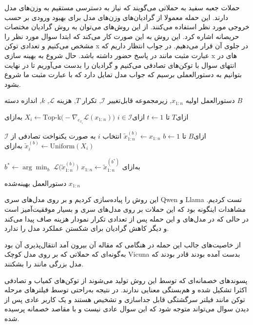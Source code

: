حملات جعبه سفید به حملاتی می‌گویند که نیاز به دسترسی مستقیم به وزن‌های مدل دارند. این حمله معمولا از گرادیان‌های وزن‌های مدل برای بهبود ورودی بر حسب خروجی مورد نظر استفاده می‌کنند. از این روش‌های می‌توان به روش گرادیان مختصات حریصانه اشاره کرد. این روش به این صورت کار می‌کند که ابتدا سوال مورد نظر را مشخص می‌کنیم و تعدادی توکن x در جلوی آن قرار می‌دهیم. در جواب انتظار داریم که عبارت مثبت مانند  در پاسخ حضور داشته باشد. حال شروع به بهینه سازی x های در انتهای سوال با توکن‌های تصادفی می‌کنیم و گرادیان را بدست می‌آوریم تا در نهایت بتوانیم به دستورالعملی برسیم که جواب مدل تمایل دارد که با عبارت مثبت ما شروع بشود.

 دستورالعمل اولیه $x_{1:n}$, زیرمجموعه قابل‌تغییر $\mathcal{I}$, 
  تکرار $T$, هزینه $\mathcal{L}$, $k$, اندازه دسته $B$

‌ازای{$t \gets 1 \text{ تا } T$}
  ‌ازای{$i \in \mathcal{I}$}
     $X_i \gets \mathrm{Top\text{-}k}\bigl(-\nabla_{e_{x_i}}\mathcal{L}(x_{1:n})\bigr)$ 
  ‌به‌ازای

  ‌ازای{$b \gets 1 \text{ تا } B$}
     $\tilde{x}^{(b)}_{1:n} \gets x_{1:n}$ 
     انتخاب $i$ به صورت یکنواخت تصادفی از $\mathcal{I}$
     $\tilde{x}^{(b)}_i \gets \mathrm{Uniform}(X_i)$ 
  ‌به‌ازای

   $b^* \gets \arg \min_{b}\; \mathcal{L}\bigl(\tilde{x}^{(b)}_{1:n}\bigr)$
   $x_{1:n} \gets \tilde{x}^{(b^*)}_{1:n}$ 
‌به‌ازای

  دستورالعمل بهینه‌شده $x_{1:n}$

این روش را پیاده‌سازی کردیم و بر روی مدل‌های سری Qwen و Llama تست کردیم. مشاهدات اینگونه بود که این حملات بر روی مدل‌های سری  و  بسیار موفقیت‌آمیز است در حالی که در مدل‌های  و  این حمله پس از تعدادی تکرار نمودار هزینه صاف پیدا می‌کند و دیگر کاهش گرادیان برای شکستن عملکرد مدل را ندارد.


از خاصیت‌های جالب این حمله در هنگامی که مقاله آن بیرون آمد انتقال‌پذیری آن بود به‌گونه‌ای که حملاتی که بر روی مدل کوچک Vicuna بدست آمده بودند قادر بودند که مدل بزرگی مانند  را بشکنند.

پسوند‌های خصمانه‌ای که توسط این روش تولید می‌شوند از توکن‌های کمیاب و تصادفی اکثرا تشکیل شده و هم‌بستگی معنایی ندارند. در نتیجه به‌راحتی توسط فیلترهای مرحله توکن مانند فیلتر سرگشتگی قابل جداسازی و تشخیص هستند و یک کاربر عادی پس از دیدن سوال می‌تواند متوجه شود که این سوال عادی نیست و با مقاصد خصمانه پرسیده شده. 

